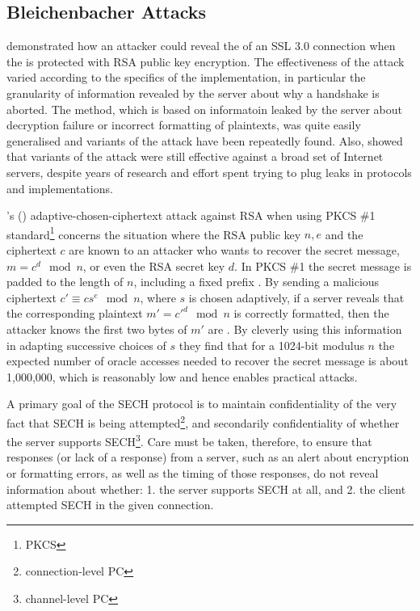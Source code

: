 \subsection{Bleichenbacher Attacks \label{bleichenbacher-attack}}
\cite{bleichenbacher1998chosen} demonstrated how an attacker could reveal the \premastersecret{} of an \ac{SSL} 3.0 connection when the \premastersecret{} is protected with \ac{RSA} public key encryption.
The effectiveness of the attack varied according to the specifics of the implementation, in particular the granularity of information revealed by the server about why a handshake is aborted.
The method, which is based on informatoin leaked by the server about decryption failure or incorrect formatting of plaintexts, was quite easily generalised and variants of the attack have been repeatedly found.
Also, \cite{boeck2018robot} showed that variants of the attack were still effective against a broad set of Internet servers, despite years of research and effort spent trying to plug leaks in protocols and implementations.

\citeauthor{bleichenbacher1998chosen}'s (\citeyear{bleichenbacher1998chosen}) adaptive-chosen-ciphertext attack against \ac{RSA} when using  PKCS \#1 standard\footnote{\ac{PKCS}} concerns the situation where
the \ac{RSA} public key $n,e$ and the ciphertext $c$
are known to an attacker who wants to recover the secret message, $m=c^d\mod n$, or even
the \ac{RSA} secret key $d$.
In \ac{PKCS} \#1 the secret message is padded to the length of $n$, including a fixed prefix .
By sending a malicious ciphertext $c'\equiv cs^e\mod n$, where $s$ is chosen adaptively, if a server reveals that the corresponding plaintext $m'=c'^d\mod n$ is correctly formatted, then the attacker knows the first two bytes of $m'$ are .
By cleverly using this information in adapting successive choices of $s$ they find that for a 1024-bit modulus $n$ the expected number of oracle accesses needed to recover the secret message is about 1,000,000, which is reasonably low and hence enables practical attacks.

A primary goal of the \ac{SECH} protocol is to maintain confidentiality of the very fact that \ac{SECH} is being attempted\footnote{connection-level \ac{PC}},
and secondarily confidentiality of whether the server supports \ac{SECH}\footnote{channel-level \ac{PC}}.
Care must be taken, therefore, to ensure that responses (or lack of a response)
from a server,
such as an alert about encryption or formatting errors,
as well as the timing of those responses,
do not reveal information about whether:
1. the server supports \ac{SECH} at all, and
2. the client attempted \ac{SECH} in the given connection.
